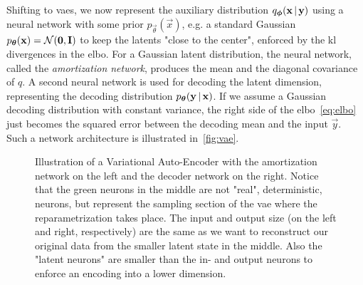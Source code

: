 	Shifting to \acp{vae}, we now represent the auxiliary distribution \( q_{\boldsymbol{\mathrm{\phi}}}(\boldsymbol{\mathrm{x}} \,\vert\, \boldsymbol{\mathrm{y}}) \) using a neural network with some prior \( p_{\vec{\theta}}(\vec{x}) \), e.g. a standard Gaussian \( p_{\boldsymbol{\mathrm{\theta}}}(\boldsymbol{\mathrm{x}}) = \mathcal{N}(\boldsymbol{\mathrm{0}}, \boldsymbol{\mathrm{I}}) \) to keep the latents "close to the center", enforced by the \ac{kl} divergences in the \ac{elbo}. For a Gaussian latent distribution, the neural network, called the \emph{amortization network}, produces the mean and the diagonal covariance of \( q \). A second neural network is used for decoding the latent dimension, representing the decoding distribution \( p_{\boldsymbol{\mathrm{\theta}}}(\boldsymbol{\mathrm{y}} \,\vert\, \boldsymbol{\mathrm{x}}) \). If we assume a Gaussian decoding distribution with constant variance, the right side of the \ac{elbo}~\eqref{eq:elbo} just becomes the squared error between the decoding mean and the input \(\vec{y}\). Such a network architecture is illustrated in~\autoref{fig:vae}.

	\begin{figure}
		\centering
		\tikzVariationalAutoEncoder
		\caption[Illustration of a variational auto-encoder]{Illustration of a Variational Auto-Encoder with the amortization network on the left and the decoder network on the right. Notice that the green neurons in the middle are not "real", deterministic, neurons, but represent the sampling section of the \ac{vae} where the reparametrization takes place. The input and output size (on the left and right, respectively) are the same as we want to reconstruct our original data from the smaller latent state in the middle. Also the "latent neurons" are smaller than the in- and output neurons to enforce an encoding into a lower dimension.}
		\label{fig:vae}
	\end{figure}


